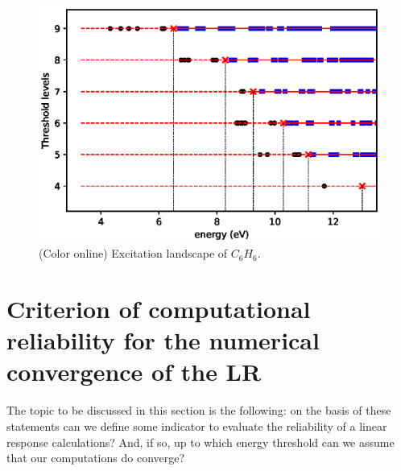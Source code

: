 \documentclass[reprint,aps,prb]{revtex4-1}
\newcommand{\eps}{\epsilon}
\begin{document}
\begin{figure}[ht]
\includegraphics[scale=0.56]{c6h6_excitationLandscape.eps}
\caption{\label{c6h6_excLand}(Color online) Excitation landscape of $C_6H_6$.}
\end{figure}
\section{Criterion of computational reliability for the numerical convergence of the LR}

The topic to be discussed in this section is the following: on the basis of these statements can we define some indicator to evaluate the reliability of a linear response calculations? And, 
if so, up to which energy threshold can we assume that our computations do converge?
\end{document}
